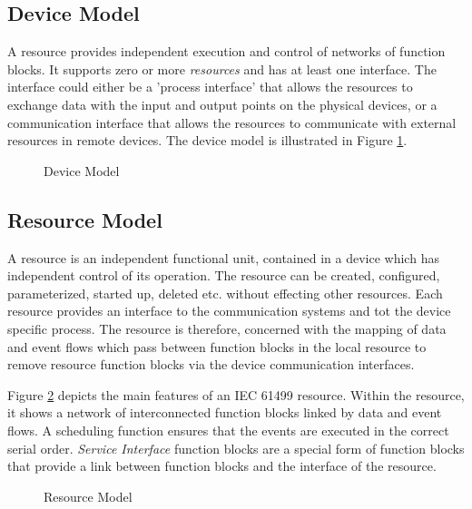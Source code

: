 \subsection{Device Model} 
A resource provides independent execution and control of
networks of function blocks. It supports zero or more {\it
  resources} and has at least one interface. The interface
could either be a 'process interface' that allows the
resources to exchange data with the input and output points
on the physical devices, or a communication interface that
allows the resources to communicate with external resources
in remote devices. The device model is illustrated in Figure
\ref{f:Device_Model}.

\begin{figure}
  \begin{center}
    \caption[Device Model]
            {Device Model{\protect ~\cite{iec:614991:2000}}}
    \label{f:Device_Model}
  \end{center}
\end{figure}

\subsection{Resource Model} 
A resource is an independent functional unit, contained in a
device which has independent control of its operation. The
resource can be created, configured, parameterized, started
up, deleted etc. without effecting other resources. Each
resource provides an interface to the communication systems
and tot the device specific process. The resource is
therefore, concerned with the mapping of data and event
flows which pass between function blocks in the local
resource to remove resource function blocks via the device
communication interfaces.
  
Figure \ref{f:Resource_Model} depicts the main features of
an IEC 61499 resource. Within the resource, it shows a
network of interconnected function blocks linked by data and
event flows. A scheduling function ensures that the events
are executed in the correct serial order. {\it Service
  Interface} function blocks are a special form of function
blocks that provide a link between function blocks and the
interface of the resource.

\begin{figure}
  \begin{center}
    \caption[Resource Model]
            {Resource Model{\protect ~\cite{iec:614991:2000}}}
    \label{f:Resource_Model}
  \end{center}
\end{figure}
  
